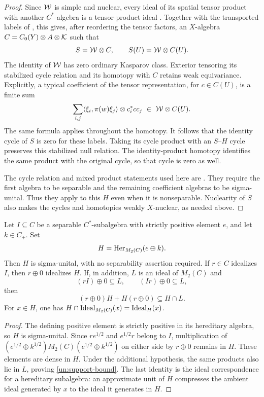 \begin{proof}
Since $\mathcal W$ is simple and nuclear, every ideal of its spatial tensor
product with another $C^*$-algebra is a tensor-product ideal
\cite[Theorem~3.1]{GuptaJain}. Together with the transported labels of
, this gives, after reordering the tensor factors, an
$X$-algebra $C=C_0(Y)\otimes A\otimes\mathcal K$ such that
\[
 S=\mathcal W\otimes C,\qquad S(U)=\mathcal W\otimes C(U).
\]
The identity of $\mathcal W$ has zero ordinary Kasparov class.  Exterior
tensoring its stabilized cycle relation and its homotopy with $C$
retains weak equivariance.  Explicitly, a typical coefficient of
the tensor representation, for $c\in C(U)$, is a finite sum
\[
 \sum_{i,j}\langle\xi_i,\pi(w)\xi_j\rangle
                  \otimes c_i^*c c_j\ \in\ \mathcal W\otimes C(U).
\]
The same formula applies throughout the homotopy.  It follows that
the identity cycle of $S$ is zero for these labels.  Taking its cycle
product with an $S$--$H$ cycle preserves this stabilized null relation.  The identity-product homotopy identifies the
same product with the original cycle, so that cycle is zero as well.

The cycle relation and mixed product statements used here are
\cite[Propositions~12.17 and~12.20 and Lemmas~12.18, 12.19,
and~12.23]{Gabe}.
They require the first algebra to be separable and the remaining
coefficient algebras to be sigma-unital.  Thus they apply to this
$H$ even when it is nonseparable.  Nuclearity of $S$ also makes the
cycles and homotopies weakly $X$-nuclear, as needed above.
\end{proof}

\begin{lemma}
\label{un:hereditary-support}
Let $I\subseteq C$ be a separable $C^*$-subalgebra with strictly
positive element $e$, and let $k\in C_+$.  Set
\[
 H=\operatorname{Her}_{M_2(C)}(e\oplus k).
\]
Then $H$ is sigma-unital, with no separability assertion required.
If $r\in C$ idealizes $I$, then $r\oplus0$ idealizes $H$.
If, in addition, $L$ is an ideal of $M_2(C)$ and
\[
 (rI)\oplus0\subseteq L,\qquad (Ir)\oplus0\subseteq L,
\]
then
\begin{equation}\label{un:support-bound}
 (r\oplus0)H+H(r\oplus0)\subseteq H\cap L.
\end{equation}
For $x\in H$, one has
$H\cap\operatorname{Ideal}_{M_2(C)}(x)=\operatorname{Ideal}_H(x)$.
\end{lemma}

\begin{proof}
The defining positive element is strictly positive in its hereditary
algebra, so $H$ is sigma-unital.  Since $r e^{1/2}$ and
$e^{1/2}r$ belong to $I$, multiplication of
$(e^{1/2}\oplus k^{1/2})M_2(C)(e^{1/2}\oplus k^{1/2})$
on either side by $r\oplus0$ remains in $H$.  These elements are
dense in $H$.  Under the additional hypothesis, the same products
also lie in $L$, proving \eqref{un:support-bound}.  The last identity
is the ideal correspondence for a hereditary subalgebra: an
approximate unit of $H$ compresses the ambient ideal generated by
$x$ to the ideal it generates in $H$.
\end{proof}

